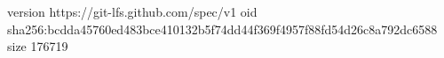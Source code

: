 version https://git-lfs.github.com/spec/v1
oid sha256:bcdda45760ed483bce410132b5f74dd44f369f4957f88fd54d26c8a792dc6588
size 176719
